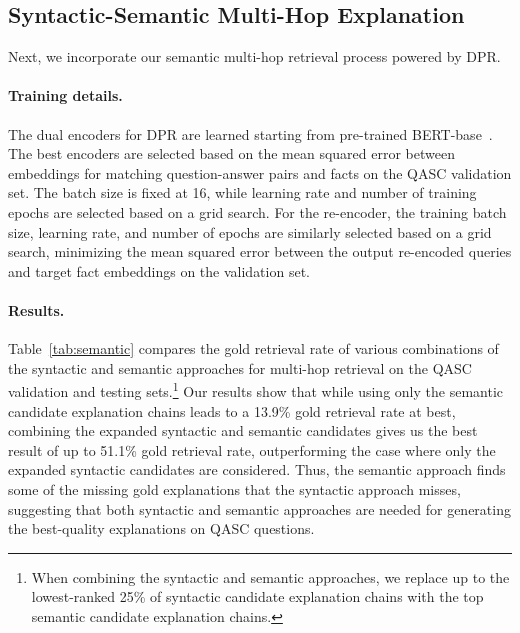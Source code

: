 \documentclass[letterpaper]{article} %
\begin{document}
\subsection{Syntactic-Semantic Multi-Hop Explanation}
Next, we incorporate our semantic multi-hop retrieval process powered by DPR.

\paragraph{Training details.}
The dual encoders for DPR are learned starting from pre-trained \textsc{BERT}-base~\cite{devlin-etal-2019-bert}. The best encoders are selected based on the mean squared error between embeddings for matching question-answer pairs and facts on the QASC validation set. The batch size is fixed at 16, while learning rate and number of training epochs are selected based on a grid search.
For the re-encoder, the training batch size, learning rate, and number of epochs are similarly selected based on a grid search, minimizing the mean squared error between the output re-encoded queries and target fact embeddings on the validation set.

\paragraph{Results.}
Table~\ref{tab:semantic} compares the gold retrieval rate of various combinations of the syntactic and semantic approaches for multi-hop retrieval on the QASC validation and testing sets.\footnote{When combining the syntactic and semantic approaches, we replace up to the lowest-ranked 25\% of syntactic candidate explanation chains with the top semantic candidate explanation chains.} Our results show that while using only the semantic candidate explanation chains leads to a 13.9\% gold retrieval rate at best, combining the expanded syntactic and semantic candidates gives us the best result of up to 51.1\% gold retrieval rate, outperforming the case where only the expanded syntactic candidates are considered. Thus, the semantic approach finds some of the missing gold explanations that the syntactic approach misses, suggesting that both syntactic and semantic approaches are needed for generating the best-quality explanations on QASC questions.
\end{document}
